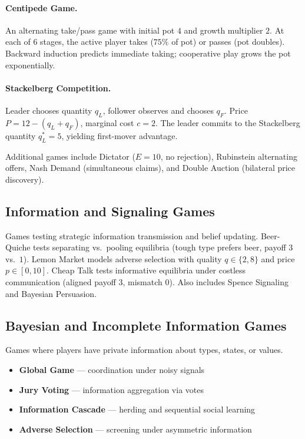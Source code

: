 \paragraph{Centipede Game.} An alternating take/pass game with initial pot $4$
and growth multiplier $2$. At each of $6$ stages, the active player takes
($75\%$ of pot) or passes (pot doubles). Backward induction predicts immediate
taking; cooperative play grows the pot exponentially.

\paragraph{Stackelberg Competition.} Leader chooses quantity $q_L$, follower
observes and chooses $q_F$. Price $P = 12 - (q_L + q_F)$, marginal cost
$c = 2$. The leader commits to the Stackelberg quantity $q_L^* = 5$,
yielding first-mover advantage.

\noindent Additional games include Dictator ($E=10$, no rejection), Rubinstein
alternating offers, Nash Demand (simultaneous claims), and Double Auction
(bilateral price discovery).

\subsection{Information and Signaling Games}
\label{sec:signaling}

Games testing strategic information transmission and belief updating.
Beer-Quiche tests separating vs.\ pooling equilibria (tough type prefers
beer, payoff $3$ vs.\ $1$). Lemon Market models adverse selection with
quality $q \in \{2, 8\}$ and price $p \in [0,10]$. Cheap Talk tests
informative equilibria under costless communication (aligned payoff $3$,
mismatch $0$). Also includes Spence Signaling and Bayesian Persuasion.

\subsection{Bayesian and Incomplete Information Games}
\label{sec:bayesian}

Games where players have private information about types, states, or values.

\begin{itemize}[nosep]
    \item \textbf{Global Game} --- coordination under noisy signals
    \item \textbf{Jury Voting} --- information aggregation via votes
    \item \textbf{Information Cascade} --- herding and sequential social learning
    \item \textbf{Adverse Selection} --- screening under asymmetric information
\end{itemize}

